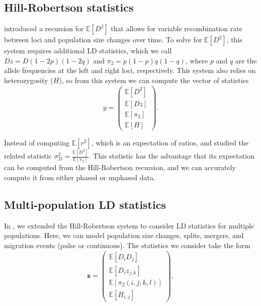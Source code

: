 \documentclass[10pt]{article}
\newcommand{\E}{\mathbb{E}}
\begin{document}
\subsection{Hill-Robertson statistics}

\citet{Hill1968} introduced a recursion for $\E[D^2]$ that allows for variable recombination rate between loci and population size changes over time.
To solve for $\E[D^2]$, this system requires additional LD statistics, which we call $Dz = D(1-2p)(1-2q)$ and $\pi_2 = p(1-p)q(1-q)$, where $p$ and $q$ are the allele frequencies at the left and right loci, respectively.
This system also relies on heterozygosity ($H$), so from this system we can compute the vector of statistics
$$y=\begin{pmatrix} \E[D^2] \\ \E[Dz] \\ \E[\pi_2] \\ \E[H] \end{pmatrix}.$$

Instead of computing $\E[r^2]$, which is an expectation of ratios, \citet{Hill1968} and \citet{Ohta1971} studied the related statistic $\sigma_D^2 = \frac{\E[D^2]}{\E[\pi_2]}$.
This statistic has the advantage that its expectation can be computed from the Hill-Robertson recursion, and we can accurately compute it from either phased or unphased data.

\subsection{Multi-population LD statistics}

In \citet{Ragsdale2018}, we extended the Hill-Robertson system to consider LD statistics for multiple populations.
Here, we can model population size changes, splits, mergers, and migration events (pulse or continuous).
The statistics we consider take the form
$$
\mathbf{z} = \begin{pmatrix} 
\E[D_i D_j] \\
\E[D_i z_{j,k}] \\
\E[{\pi_2}(i,j;k,l)] \\
\E[H_{i,j}]
\end{pmatrix},
$$
\end{document}
